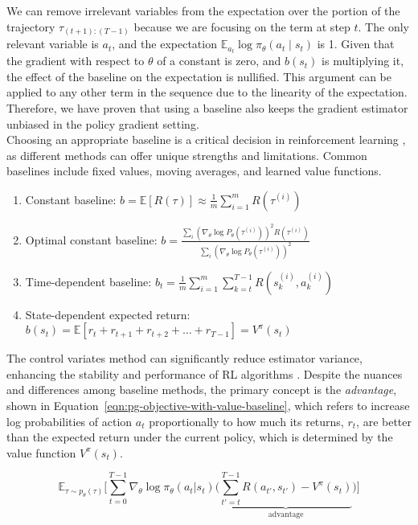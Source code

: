 \noindent We can remove irrelevant variables from the expectation over the portion of the trajectory $\tau_{(t+1):(T-1)}$ because we are focusing on the term at step $t$. The only relevant variable is $a_{t}$, and the expectation $\mathbb{E}_{a_{t}}\log\pi_{\theta}(a_{t}\mid s_{t})$ is 1. Given that the
gradient with respect to $\theta$ of a constant is zero, and $b(s_{t})$ is multiplying it, the effect of the baseline on the expectation is nullified. This argument can be applied to any other term in the sequence due to the linearity of the expectation. Therefore, we have proven that using a baseline also keeps the gradient estimator unbiased in the policy gradient setting. \\

\noindent Choosing an appropriate baseline is a critical decision in reinforcement learning \citep{foundations-deeprl-series-l3}, as different methods can offer unique strengths and limitations. Common baselines include fixed values, moving averages, and learned value functions.

\begin{enumerate}
    \item Constant baseline: $b=\mathbb{E}\left[ R(\tau)\right]\approx \frac{1}{m}\sum_{i=1}^{m} R(\tau^{(i)})$
    \item Optimal constant baseline: $b=\frac{\sum_{i}(\nabla_{\theta} \log P_{\theta}(\tau^{(i)}))^{2} R(\tau^{(i)})}{\sum_{i}(\nabla_{\theta}\log P_{\theta}(\tau^{(i)}))^{2}}$ 
    \item Time-dependent baseline: $b_{t}=\frac{1}{m} \sum_{i=1}^{m} \sum_{k=t}^{T-1} R(s_{k}^{(i)}, a_{k}^{(i)})$ 
    \item State-dependent expected return: $b(s_{t}) = \mathbb{E}\left[r_{t} + r_{t+1} + r_{t+2} + \dots + r_{T-1}\right] = V^{\pi}(s_{t})$
\end{enumerate}


\noindent The control variates method can significantly reduce estimator variance, enhancing the stability and performance of RL algorithms \cite{NIPS2001_584b98aa}. Despite the nuances and differences among baseline methods, the primary concept is the \textit{advantage}, shown in Equation~\ref{eqn:pg-objective-with-value-baseline}, which refers to increase log probabilities of action $a_{t}$ proportionally to how much its returns, $r_{t}$, are better than the expected return under the current policy, which is determined by the value function $V^{\pi}(s_{t})$.

\begin{equation}\label{eqn:pg-objective-with-value-baseline}
    \mathbb{E}_{\tau\sim p_{\theta}(\tau)} \bigg[\sum_{t=0}^{T-1}\nabla_{\theta}\log\pi_{\theta}(a_{t}|s_{t}) \bigg(\underbrace{\sum_{t'=t}^{T-1} R(a_{t'}, s_{t'}) -V^{\pi}(s_{t})}_{\text{advantage}} \bigg) \bigg]
\end{equation}

